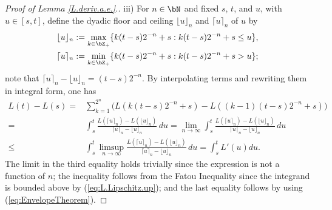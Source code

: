 \documentclass{amsart}
\begin{document}
\begin{proof}[Proof of Lemma \ref{L.deriv.a.e.}.]
iii) For $n\in\bN$ and fixed $s$, $t$, and $u$, with $u\in [s,t]$, define the dyadic floor and ceiling  $\lfloor u \rfloor_n$ and $\lceil u \rceil_n$ of $u$ by 
\begin{align*}
\lfloor u \rfloor_n &:= \max_{k\in\bZ_+}\{ k (t-s) 2^{-n} + s :  k (t-s) 2^{-n} + s \leq u\}, \\
 \lceil u \rceil_n &:=\min_{k\in\bZ_+}\{ k (t-s) 2^{-n} + s :  k (t-s) 2^{-n} + s > u\};
\end{align*}
note that $\lceil u \rceil_n -\lfloor u \rfloor_n= (t-s)2^{-n}$. By interpolating terms and rewriting them in integral form, one has
\begin{align*}
 L(t) - L(s)
 = & \sum_{k=1}^{2^{n}} \Big( L (k(t-s)2^{-n}+s)- L ((k-1)(t-s)2^{-n}+s) \Big) \\
 =  & \int_s^{t} \frac{ L (\lceil u \rceil_n)- L (\lfloor u \rfloor_n)}{\lceil u \rceil_n -\lfloor u \rfloor_n}  \, du 
  =   \lim_{n \rightarrow \infty} \int_s^t\frac{ L (\lceil u \rceil_n)- L (\lfloor u \rfloor_n)}{\lceil u \rceil_n -\lfloor u \rfloor_n}  \,  du \\
\leq & \int_s^t \limsup_{n \rightarrow \infty}   \frac{ L (\lceil u \rceil_n)- L (\lfloor u \rfloor_n)}{\lceil u \rceil_n -\lfloor u \rfloor_n}  \,  du 
=   \int_s^t L'(u) du.
\end{align*}
The limit in the third equality holds trivially since the expression is not a function of $n$; the inequality follows from the Fatou Inequality since the integrand is bounded above by (\ref{eq:L.Lipschitz.up}); and the last equality follows by using (\ref{eq:EnvelopeTheorem}).
\end{proof}

\iffalse
Defining 
 $\bar f_n(x) = f_n(\left\lceil 2^n \, (x-s)/(t-s) \right\rceil)$ 
and
 $\underline f_n(x) = f_n(\left\lfloor  2^n \, (x-s)/(t-s)  \right\rfloor)$ 
it follows that 
\begin{align}
 L(t) - L(s)
 =   \int_s^t \frac{L (\bar f_n(x))- L (\underline f_n(x))}{(t-s)2^{-n}}   \,  dx 
 = &  \lim_{n \rightarrow \infty} \int_s^t \frac{L (\bar f_n(x))- L (\underline f_n(x))}{(t-s)2^{-n}}   \,  dx \nonumber 
\end{align}
\fi
\iffalse
Since $| \bar f_n(x) - \underline f_n(x)| \leq 2^{-n}$, using the upperbound \eqref{eq:L.Lipschitz.up} and the bounded convergence theorem we get
\begin{align}
 L(t) - L(s)
\leq  &  \int_s^t 
 \lim\sup_{n \rightarrow \infty} 
\frac{L (\bar f_n(x))- L (\underline f_n(x))}{\bar f_n(x) - \underline f_n(x)} \, 
\frac{\bar f_n(x) - \underline f_n(x)}{(t-s)2^{-n}}   \, dx  \nonumber \\
= & \int_s^t \frac{dL(x)}{dt} dx.
\end{align}
where we used that $\bar f_n(x), \, \underline f_n(x) \to x$ and the second fraction converges to $1$.
\fi
\end{document}
